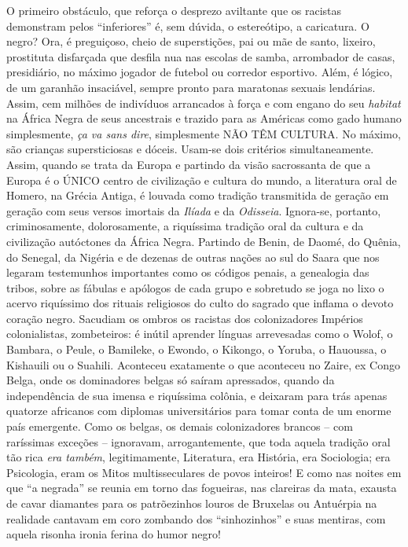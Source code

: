 \documentclass[
  letterpaper,
  DIV=11,
  numbers=noendperiod]{scrreprt}
\begin{document}
O primeiro obstáculo, que reforça o desprezo aviltante que os racistas
demonstram pelos ``inferiores'' é, sem dúvida, o estereótipo, a
caricatura. O negro? Ora, é preguiçoso, cheio de superstições, pai ou
mãe de santo, lixeiro, prostituta disfarçada que desfila nua nas escolas
de samba, arrombador de casas, presidiário, no máximo jogador de futebol
ou corredor esportivo. Além, é lógico, de um garanhão insaciável, sempre
pronto para maratonas sexuais lendárias. Assim, cem milhões de
indivíduos arrancados à força e com engano do seu \emph{habitat} na
África Negra de seus ancestrais e trazido para as Américas como gado
humano simplesmente, \emph{ça va sans dire}, simplesmente NÃO TÊM
CULTURA. No máximo, são crianças supersticiosas e dóceis. Usam-se dois
critérios simultaneamente. Assim, quando se trata da Europa e partindo
da visão sacrossanta de que a Europa é o ÚNICO centro de civilização e
cultura do mundo, a literatura oral de Homero, na Grécia Antiga, é
louvada como tradição transmitida de geração em geração com seus versos
imortais da \emph{Ilíada} e da \emph{Odisseia}. Ignora-se, portanto,
criminosamente, dolorosamente, a riquíssima tradição oral da cultura e
da civilização autóctones da África Negra. Partindo de Benin, de Daomé,
do Quênia, do Senegal, da Nigéria e de dezenas de outras nações ao sul
do Saara que nos legaram testemunhos importantes como os códigos penais,
a genealogia das tribos, sobre as fábulas e apólogos de cada grupo e
sobretudo se joga no lixo o acervo riquíssimo dos rituais religiosos do
culto do sagrado que inflama o devoto coração negro. Sacudiam os ombros
os racistas dos colonizadores Impérios colonialistas, zombeteiros: é
inútil aprender línguas arrevesadas como o Wolof, o Bambara, o Peule, o
Bamileke, o Ewondo, o Kikongo, o Yoruba, o Hauoussa, o Kishauili ou o
Suahili. Aconteceu exatamente o que aconteceu no Zaire, ex Congo Belga,
onde os dominadores belgas só saíram apressados, quando da independência
de sua imensa e riquíssima colônia, e deixaram para trás apenas quatorze
africanos com diplomas universitários para tomar conta de um enorme país
emergente. Como os belgas, os demais colonizadores brancos -- com
raríssimas exceções -- ignoravam, arrogantemente, que toda aquela
tradição oral tão rica \emph{era também}, legitimamente, Literatura, era
História, era Sociologia; era Psicologia, eram os Mitos multisseculares
de povos inteiros! E como nas noites em que ``a negrada'' se reunia em
torno das fogueiras, nas clareiras da mata, exausta de cavar diamantes
para os patrõezinhos louros de Bruxelas ou Antuérpia na realidade
cantavam em coro zombando dos ``sinhozinhos'' e suas mentiras, com
aquela risonha ironia ferina do humor negro!
\end{document}
